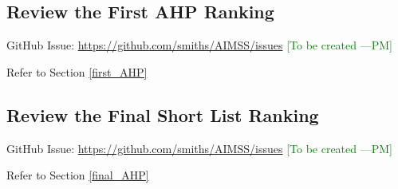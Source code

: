 \documentclass[12pt]{article}
\newcommand{\authornote}[3]{\textcolor{#1}{[#3 ---#2]}}
\newcommand{\authornote}[3]{}
\newcommand{\pmi}[1]{\authornote{green}{PM}{#1}} %
\newcommand{\ad}[1]{\authornote{brown}{AD}{#1}} %
\begin{document}
\subsection{Review the First AHP Ranking}
\label{task_first_ranking}
GitHub Issue:
\href{https://github.com/smiths/AIMSS/issues}{https://github.com/smiths/AIMSS/issues}
\pmi{To be created}

\noindent Refer to Section \ref{first_AHP}

\subsection{Review the Final Short List Ranking}
\label{task_final_ranking}
GitHub Issue:
\href{https://github.com/smiths/AIMSS/issues}{https://github.com/smiths/AIMSS/issues}
\pmi{To be created}

\noindent Refer to Section \ref{final_AHP}

%
%
%
\end{document}
